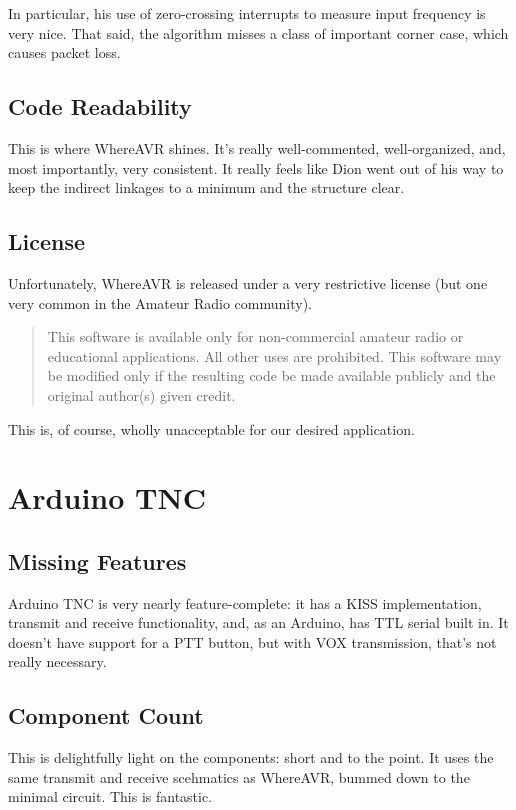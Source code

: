 In particular, his use of zero-crossing interrupts to measure input
frequency is very nice.  That said, the algorithm misses a class of
important corner case, which causes packet loss.

\subsection{Code Readability}

This is where WhereAVR shines.  It's really well-commented,
well-organized, and, most importantly, very consistent.  It really
feels like Dion went out of his way to keep the indirect linkages to a
minimum and the structure clear.


\subsection{License}

Unfortunately, WhereAVR is released under a very restrictive license
(but one very common in the Amateur Radio community).
\begin{quote}
  This software is available only for non-commercial amateur radio or
  educational applications.  All other uses are prohibited.  This
  software may be modified only if the resulting code be made
  available publicly and the original author(s) given credit.
\end{quote}

This is, of course, wholly unacceptable for our desired application.

\section{Arduino TNC}
\subsection{Missing Features}

Arduino TNC\cite{ArduinoTNC} is very nearly feature-complete: it has a
KISS implementation, transmit and receive functionality, and, as an
Arduino, has TTL serial built in.  It doesn't have support for a PTT
button, but with VOX transmission, that's not really necessary.

\subsection{Component Count}

This is delightfully light on the components: short and to the point.
It uses the same transmit and receive scehmatics as WhereAVR, bummed
down to the minimal circuit.  This is fantastic.

